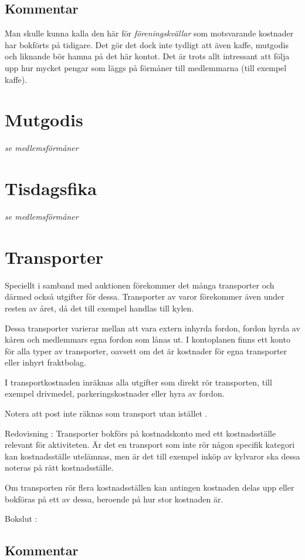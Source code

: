 				\subsection{Kommentar}
				Man skulle kunna kalla den här för \emph{föreningskvällar} som motsvarande kostnader har bokförts på tidigare. Det gör det dock inte tydligt att även kaffe, mutgodis och liknande bör hamna på det här kontot. Det är trots allt intressant att följa upp hur mycket pengar som läggs på förmåner till medlemmarna (till exempel kaffe).
				\section{Mutgodis}
				\emph{se medlemsförmåner}
			
				\section{Tisdagsfika}
				\emph{se medlemsförmåner}
			
				\section{Transporter}
				
				Speciellt i samband med auktionen förekommer det många transporter och därmed också utgifter för dessa. Transporter av varor förekommer även under resten av året, då det till exempel handlas till kylen.
		
		Dessa transporter varierar mellan att vara extern inhyrda fordon, fordon hyrda av kåren och medlemmars egna fordon som lånas ut. I kontoplanen finns ett konto för alla typer av transporter, oavsett om det är kostnader för egna transporter eller inhyrt fraktbolag.
		
		I transportkostnaden inräknas alla utgifter som direkt rör transporten, till exempel drivmedel, parkeringskostnader eller hyra av fordon.
		
		Notera att post inte räknas som transport utan istället .
		
			
				\begin{redovisning}
					Redovisning : Transporter bokförs på kostnadskonto  med ett kostnadsställe relevant för aktiviteten. Är det en transport som inte rör någon specifik kategori kan kostnadsställe utelämnas, men är det till exempel inköp av kylvaror ska dessa noteras på rätt kostnadsställe.
		
		Om transporten rör flera kostnadsställen kan antingen kostnaden delas upp eller bokföras på ett av dessa, beroende på hur stor kostnaden är.
				\end{redovisning}
			
				\begin{bokslut}
					Bokslut : 
				\end{bokslut}
			
				\subsection{Kommentar}
				